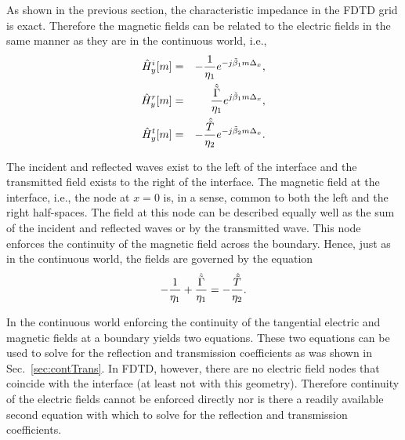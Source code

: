 As shown in the previous section, the characteristic impedance in the
FDTD grid is exact.  Therefore the magnetic fields can be related to
the electric fields in the same manner as they are in the continuous
world, i.e.,
\begin{eqnarray}
   \hat{H}_y^{i}[m] &=& -\frac{1}{\eta_1}e^{-j\tilde{\beta}_1 m\Delta_x},
     \label{eq:hInc}\\
   \hat{H}_y^{r}[m] &=& \frac{\hat{\tilde{\Gamma}} }{\eta_1}e^{j\tilde{\beta}_1 m\Delta_x}, \\
   \hat{H}_y^{t}[m] &=& -\frac{\hat{\tilde{T}}}{\eta_2} e^{-j\tilde{\beta}_2 m\Delta_x}.
     \label{eq:hTrans}
\end{eqnarray}

The incident and reflected waves exist to the left of the interface
and the transmitted field exists to the right of the interface.  The
magnetic field at the interface, i.e., the node at $x=0$ is, in a
sense, common to both the left and the right half-spaces.  The field
at this node can be described equally well as the sum of the
incident and reflected waves or by the transmitted wave.  This node
enforces the continuity of the magnetic field across the boundary.
Hence, just as in the continuous world, the fields are governed by the
equation
\begin{equation}
  -\frac{1}{\eta_1} + \frac{\hat{\tilde{\Gamma}}}{\eta_1} = -\frac{\hat{\tilde{T}}}{\eta_2}.
  \label{eq:magContinuity}
\end{equation}

In the continuous world enforcing the continuity of the tangential
electric and magnetic fields at a boundary yields two equations.
These two equations can be used to solve for the reflection and
transmission coefficients as was shown in Sec.\ \ref{sec:contTrans}.
In FDTD, however, there are no electric field nodes that coincide with
the interface (at least not with this geometry).  Therefore continuity
of the electric fields cannot be enforced directly nor is there a
readily available second equation with which to solve for the
reflection and transmission coefficients.

